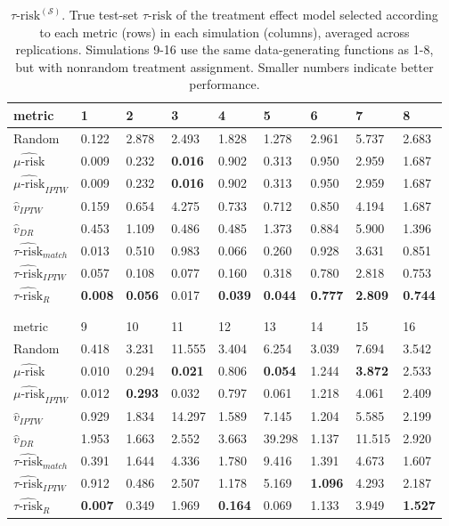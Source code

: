 \begin{table}[ht]
\centering
\caption{$\tau\text{-risk}^{(\mathcal{S})}$. True test-set $\tau\text{-risk}$ of the treatment effect model selected according to each metric (rows) in each simulation (columns), averaged across replications. Simulations 9-16 use the same data-generating functions as 1-8, but with nonrandom treatment assignment. Smaller numbers indicate better performance.}
\begin{tabular}{lllllllll}
  \hline
metric & 1 & 2 & 3 & 4 & 5 & 6 & 7 & 8 \\ 
  \hline
Random & 0.122 & 2.878 & 2.493 & 1.828 & 1.278 & 2.961 & 5.737 & 2.683 \\ 
  $\widehat{\mu\text{-risk}}$ & 0.009 & 0.232 & \bfseries{0.016} & 0.902 & 0.313 & 0.950 & 2.959 & 1.687 \\ 
  $\widehat{\mu\text{-risk}}_{IPTW}$ & 0.009 & 0.232 & \bfseries{0.016} & 0.902 & 0.313 & 0.950 & 2.959 & 1.687 \\ 
  $\hat v_{IPTW}$ & 0.159 & 0.654 & 4.275 & 0.733 & 0.712 & 0.850 & 4.194 & 1.687 \\ 
  $\hat v_{DR}$ & 0.453 & 1.109 & 0.486 & 0.485 & 1.373 & 0.884 & 5.900 & 1.396 \\ 
  $\widehat{\tau\text{-risk}}_{match}$ & 0.013 & 0.510 & 0.983 & 0.066 & 0.260 & 0.928 & 3.631 & 0.851 \\ 
  $\widehat{\tau\text{-risk}}_{IPTW}$ & 0.057 & 0.108 & 0.077 & 0.160 & 0.318 & 0.780 & 2.818 & 0.753 \\ 
  $\widehat{\tau\text{-risk}}_{R}$ & \bfseries{0.008} & \bfseries{0.056} & 0.017 & \bfseries{0.039} & \bfseries{0.044} & \bfseries{0.777} & \bfseries{2.809} & \bfseries{0.744} \\ 
  \hline
   \\
  \\
  \hline
metric & 9 & 10 & 11 & 12 & 13 & 14 & 15 & 16 \\ 
  \hline
Random & 0.418 & 3.231 & 11.555 & 3.404 & 6.254 & 3.039 & 7.694 & 3.542 \\ 
  $\widehat{\mu\text{-risk}}$ & 0.010 & 0.294 & \bfseries{0.021} & 0.806 & \bfseries{0.054} & 1.244 & \bfseries{3.872} & 2.533 \\ 
  $\widehat{\mu\text{-risk}}_{IPTW}$ & 0.012 & \bfseries{0.293} & 0.032 & 0.797 & 0.061 & 1.218 & 4.061 & 2.409 \\ 
  $\hat v_{IPTW}$ & 0.929 & 1.834 & 14.297 & 1.589 & 7.145 & 1.204 & 5.585 & 2.199 \\ 
  $\hat v_{DR}$ & 1.953 & 1.663 & 2.552 & 3.663 & 39.298 & 1.137 & 11.515 & 2.920 \\ 
  $\widehat{\tau\text{-risk}}_{match}$ & 0.391 & 1.644 & 4.336 & 1.780 & 9.416 & 1.391 & 4.673 & 1.607 \\ 
  $\widehat{\tau\text{-risk}}_{IPTW}$ & 0.912 & 0.486 & 2.507 & 1.178 & 5.169 & \bfseries{1.096} & 4.293 & 2.187 \\ 
  $\widehat{\tau\text{-risk}}_{R}$ & \bfseries{0.007} & 0.349 & 1.969 & \bfseries{0.164} & 0.069 & 1.133 & 3.949 & \bfseries{1.527} \\ 
   \hline
\end{tabular}


\end{table}
